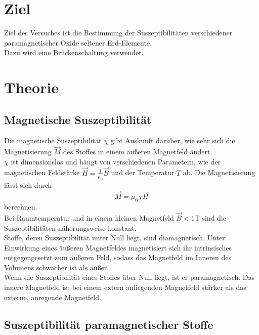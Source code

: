 \section{Ziel}
\label{sec:Ziel}

Ziel des Versuches ist die Bestimmung der Suszeptibilitäten
verschiedener paramagnetischer Oxide seltener Erd-Elemente.\\
Dazu wird eine Brückenschaltung verwendet.\\ 


\section{Theorie}
\label{sec:Theorie}

\subsection{Magnetische Suszeptibilität}

Die magnetische Suszeptibilität $\chi$ gibt Auskunft darüber, wie sehr sich 
die Magnetisierung $\vec{M}$ des Stoffes in einem äußeren Magnetfeld ändert.\\
$\chi$ ist dimensionslos und hängt von verschiedenen Parametern, wie der magnetischen Feldstärke
$\vec{H} = \frac{1}{\mu_0} \vec{B}$ und der Temperatur $T$ ab. Die Magnetisierung lässt sich durch
\begin{equation*}
    \vec{M} = \mu_0 \chi \vec{H}
\end{equation*}
berechnen.\\
Bei Raumtemperatur und in einem kleinen Magnetfeld $\vec{B} < 1 \mathrm{T}$ sind die Suszeptibilitäten
näherungsweise konstant. \\
Stoffe, deren Suszeptibilität unter Null liegt, sind diamagnetisch. Unter Einwirkung eines äußeren Magnetfeldes
magnetisiert sich ihr intrinsisches entgegengesetzt zum äußeren Feld, sodass 
das Magnetfeld im Inneren des Volumens schwächer ist als außen. \\
Wenn die Suszeptibilität eines Stoffes über Null liegt, ist er paramagnetisch. 
Das innere Magnetfeld ist bei einem extern anliegenden Magnetfeld stärker als das externe, anregende Magnetfeld.\\



\subsection{Suszeptibilität paramagnetischer Stoffe}

